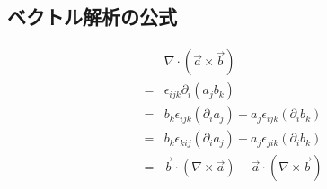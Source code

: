 \subsection{ベクトル解析の公式}


\begin{align}
&\nabla\cdot\left(\vec{a}\times\vec{b}\right)\\
=&\epsilon_{ijk}\partial_i\left(a_jb_k\right)\\
=&b_k\epsilon_{ijk}\left(\partial_ia_j\right)
 +a_j\epsilon_{ijk}\left(\partial_ib_k\right)\\
=&b_k\epsilon_{kij}\left(\partial_ia_j\right)
 -a_j\epsilon_{jik}\left(\partial_ib_k\right)\\
=&\vec{b}\cdot\left(\nabla\times\vec{a}\right)
 -\vec{a}\cdot\left(\nabla\times\vec{b}\right)
\end{align}